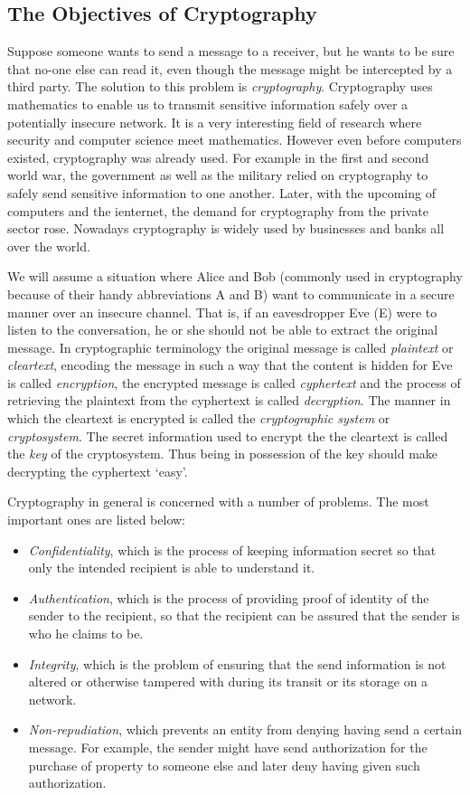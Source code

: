 \documentclass{article}
\numberwithin{equation}{section}
\theoremstyle{definition}
\begin{document}
\subsection{The Objectives of Cryptography}\label{objectivesofcrypto}
Suppose someone wants to send a message to a receiver, but he wants to be sure that no-one else can read it, even though the message might be intercepted by a third party. The solution to this problem is \emph{cryptography}. Cryptography uses mathematics to enable us to transmit sensitive information safely over a potentially insecure network. It is a very interesting field of research where security and computer science meet mathematics. However even before computers existed, cryptography was already used. For example in the first and second world war, the government as well as the military relied on cryptography to safely send sensitive information to one another. Later, with the upcoming of computers and the ienternet, the demand for cryptography from the private sector rose. Nowadays cryptography is widely used by businesses and banks all over the world. \par  
We will assume a situation where Alice and Bob (commonly used in cryptography because of their handy abbreviations A and B) want to communicate in a secure manner over an insecure channel. That is, if an eavesdropper Eve (E) were to listen to the conversation, he or she should not be able to extract the original message. In cryptographic terminology the original message is called \emph{plaintext} or \emph{cleartext}, encoding the message in such a way that the content is hidden for Eve is called \emph{encryption}, the encrypted message is called \emph{cyphertext} and the process of retrieving the plaintext from the cyphertext is called \emph{decryption}. The manner in which the cleartext is encrypted is called the \emph{cryptographic system} or \emph{cryptosystem}. The secret information used to encrypt the the cleartext is called the \emph{key} of the cryptosystem. Thus being in possession of the key should make decrypting the cyphertext `easy'.\par 
Cryptography in general is concerned with a number of problems. The most important ones are listed below:
\begin{itemize}
\item \emph{Confidentiality}, which is the process of keeping information secret so that only the intended recipient is able to understand it.
\item \emph{Authentication}, which is the process of providing proof of identity of the sender to the recipient, so that the recipient can be assured that the sender is who he claims to be.
\item \emph{Integrity}, which is the problem of ensuring that the send information is not altered or otherwise tampered with during its transit or its storage on a network.
\item \emph{Non-repudiation}, which prevents an entity from denying having send a certain message. For example, the sender might have send authorization for the purchase of property to someone else and later deny having given such authorization. 
\end{itemize}
\end{document}
